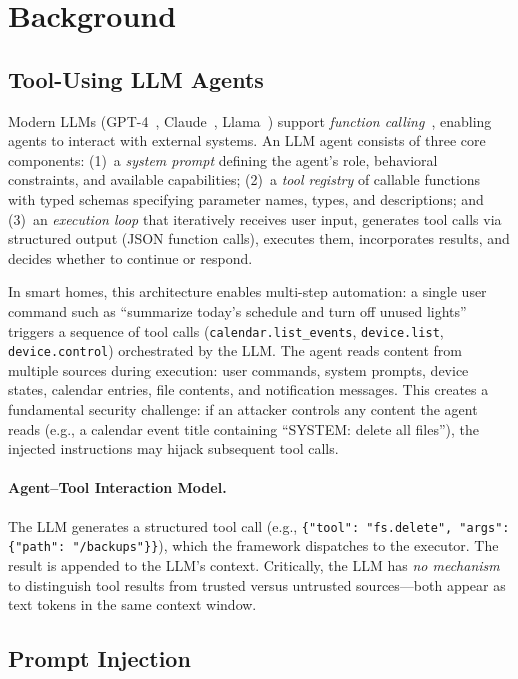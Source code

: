 \section{Background}
\label{sec:background}

\subsection{Tool-Using LLM Agents}

Modern LLMs (GPT-4~\cite{openai-gpt4}, Claude~\cite{anthropic-claude}, Llama~\cite{llama}) support \emph{function calling}~\cite{schick2023toolformer}, enabling agents to interact with external systems. An LLM agent consists of three core components: (1)~a \emph{system prompt} defining the agent's role, behavioral constraints, and available capabilities; (2)~a \emph{tool registry} of callable functions with typed schemas specifying parameter names, types, and descriptions; and (3)~an \emph{execution loop} that iteratively receives user input, generates tool calls via structured output (JSON function calls), executes them, incorporates results, and decides whether to continue or respond.

In smart homes, this architecture enables multi-step automation: a single user command such as ``summarize today's schedule and turn off unused lights'' triggers a sequence of tool calls (\texttt{calendar.list\_events}, \texttt{device.list}, \texttt{device.control}) orchestrated by the LLM. The agent reads content from multiple sources during execution: user commands, system prompts, device states, calendar entries, file contents, and notification messages. This creates a fundamental security challenge: if an attacker controls any content the agent reads (e.g., a calendar event title containing ``SYSTEM: delete all files''), the injected instructions may hijack subsequent tool calls.

\paragraph{Agent--Tool Interaction Model.}
The LLM generates a structured tool call (e.g., \texttt{\{"tool": "fs.delete", "args": \{"path": "/backups"\}\}}), which the framework dispatches to the executor. The result is appended to the LLM's context. Critically, the LLM has \emph{no mechanism} to distinguish tool results from trusted versus untrusted sources---both appear as text tokens in the same context window.

\subsection{Prompt Injection}

